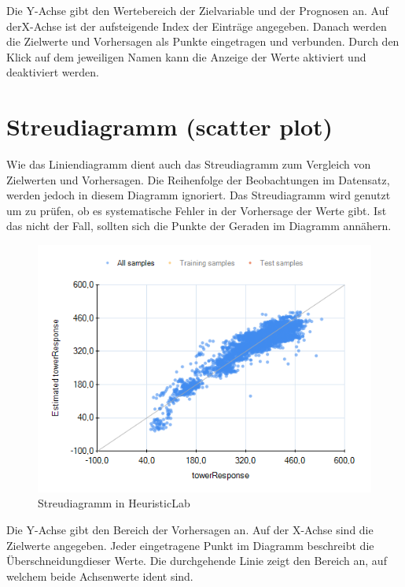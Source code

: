 \noindent Die Y-Achse gibt den Wertebereich der Zielvariable und der Prognosen an. Auf der\linebreak X-Achse ist der aufsteigende Index der Einträge angegeben.
Danach werden die Zielwerte und Vorhersagen als Punkte eingetragen und verbunden. Durch den Klick auf dem jeweiligen Namen kann die Anzeige der Werte aktiviert und deaktiviert werden.

\pagebreak

\section{Streudiagramm (scatter plot)}
\label{sec:scatter-plot}

Wie das Liniendiagramm dient auch das Streudiagramm zum Vergleich von Zielwerten und Vorhersagen. Die Reihenfolge der Beobachtungen im Datensatz, werden jedoch in diesem Diagramm ignoriert. Das Streudiagramm wird genutzt um zu prüfen,
ob es systematische Fehler in der Vorhersage der Werte gibt. Ist das nicht der Fall, sollten sich die Punkte der Geraden im Diagramm annähern.

\begin{figure}[H]
    \centering
    \includegraphics[height=.6\textwidth]{images/scatter-plot.png}
    \caption{Streudiagramm in HeuristicLab}
    \label{fig:example_scatter_plot}
\end{figure}

\noindent Die Y-Achse gibt den Bereich der Vorhersagen an. Auf der X-Achse sind die Zielwerte angegeben. Jeder eingetragene Punkt im Diagramm beschreibt die Überschneidung\linebreak dieser Werte. Die durchgehende Linie zeigt den Bereich an, auf welchem beide Achsenwerte ident sind.

